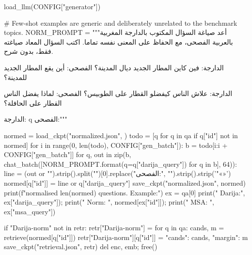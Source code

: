 load_llm(CONFIG["generator"])

# Few-shot examples are generic and deliberately unrelated to the benchmark topics.
NORM_PROMPT = """أعد صياغة السؤال المكتوب بالدارجة المغربية بالعربية الفصحى، مع الحفاظ على المعنى نفسه تماما.
اكتب السؤال المعاد صياغته فقط، بدون شرح.

الدارجة: فين كاين المطار الجديد ديال المدينة؟
الفصحى: أين يقع المطار الجديد للمدينة؟

الدارجة: علاش الناس كيفضلو القطار على الطوبيس؟
الفصحى: لماذا يفضل الناس القطار على الحافلة؟

الدارجة: {q}
الفصحى:"""

normed = load_ckpt("normalized.json", {})
todo = [q for q in qa if q["id"] not in normed]
for i in range(0, len(todo), CONFIG["gen_batch"]):
    b = todo[i:i + CONFIG["gen_batch"]]
    for q, out in zip(b, chat_batch([NORM_PROMPT.format(q=q["darija_query"]) for q in b], 64)):
        line = (out or "").strip().split("\n")[0].replace("الفصحى:", "").strip().strip('"«»')
        normed[q["id"]] = line or q["darija_query"]
    save_ckpt("normalized.json", normed)
print(f"normalised {len(normed)} questions. Example:")
ex = qa[0]
print("  Darija:", ex["darija_query"]); print("  Norm:  ", normed[ex["id"]]); print("  MSA:   ", ex["msa_query"])

if "Darija-norm" not in retr:
    retr["Darija-norm"] = {}
    for q in qa:
        cands, m = retrieve(normed[q["id"]])
        retr["Darija-norm"][q["id"]] = {"cands": cands, "margin": m}
    save_ckpt("retrieval.json", retr)
del enc, emb; free()

